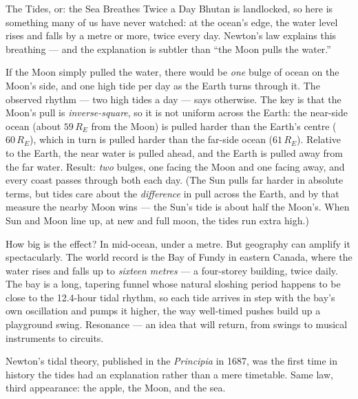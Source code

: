 \begin{supplementary}{The Tides, or: the Sea Breathes Twice a Day}
Bhutan is landlocked, so here is something many of us have never watched: at
the ocean's edge, the water level rises and falls by a metre or more, twice
every day. Newton's law explains this breathing --- and the explanation is
subtler than ``the Moon pulls the water.''

If the Moon simply pulled the water, there would be \emph{one} bulge of ocean
on the Moon's side, and one high tide per day as the Earth turns through it.
The observed rhythm --- two high tides a day --- says otherwise. The key is
that the Moon's pull is \emph{inverse-square}, so it is not uniform across
the Earth: the near-side ocean (about $59\,R_E$ from the Moon) is pulled
harder than the Earth's centre ($60\,R_E$), which in turn is pulled harder
than the far-side ocean ($61\,R_E$). Relative to the Earth, the near water
is pulled ahead, and the Earth is pulled away from the far water. Result:
\emph{two} bulges, one facing the Moon and one facing away, and every coast
passes through both each day. (The Sun pulls far harder in absolute terms,
but tides care about the \emph{difference} in pull across the Earth, and by
that measure the nearby Moon wins --- the Sun's tide is about half the
Moon's. When Sun and Moon line up, at new and full moon, the tides run
extra high.)

How big is the effect? In mid-ocean, under a metre. But geography can
amplify it spectacularly. The world record is the Bay of Fundy in eastern
Canada, where the water rises and falls up to \emph{sixteen metres} --- a
four-storey building, twice daily. The bay is a long, tapering funnel whose
natural sloshing period happens to be close to the 12.4-hour tidal rhythm,
so each tide arrives in step with the bay's own oscillation and pumps it
higher, the way well-timed pushes build up a playground swing. Resonance ---
an idea that will return, from swings to musical instruments to circuits.

Newton's tidal theory, published in the \emph{Principia} in 1687, was the
first time in history the tides had an explanation rather than a mere
timetable. Same law, third appearance: the apple, the Moon, and the sea.
\end{supplementary}
